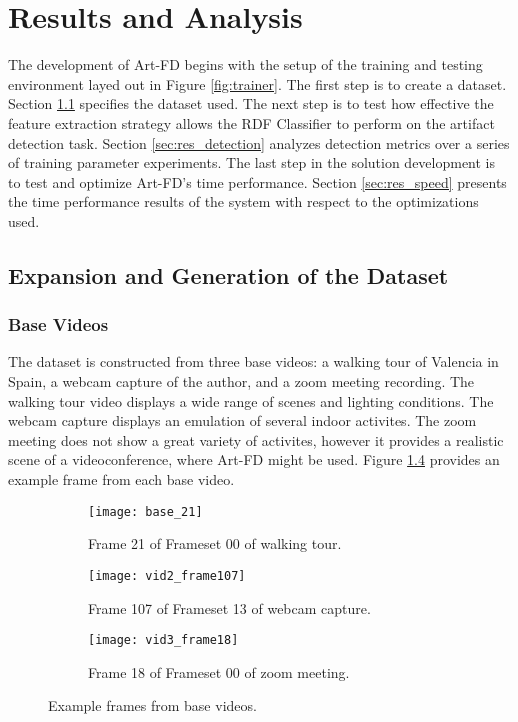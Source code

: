\chapter{Results and Analysis}
\label{chp:results}

The development of Art-FD begins with the setup of the training and testing environment layed out in Figure \ref{fig:trainer}. The first step is to create a dataset. Section \ref{sec:res_dataset} specifies the dataset used. The next step is to test how effective the feature extraction strategy allows the RDF Classifier to perform on the artifact detection task. Section \ref{sec:res_detection} analyzes detection metrics over a series of training parameter experiments. The last step in the solution development is to test and optimize Art-FD's time performance. Section \ref{sec:res_speed} presents the time performance results of the system with respect to the optimizations used.

\section{Expansion and Generation of the Dataset}
\label{sec:res_dataset}

\subsection{Base Videos}
\label{sec:res_base_videos}

The dataset is constructed from three base videos: a walking tour of Valencia in Spain, a webcam capture of the author, and a zoom meeting recording. The walking tour video displays a wide range of scenes and lighting conditions. The webcam capture displays an emulation of several indoor activites. The zoom meeting does not show a great variety of activites, however it provides a realistic scene of a videoconference, where Art-FD might be used. Figure \ref{fig:ds_example} provides an example frame from each base video.

\begin{figure} [!h]
  \centering
  
  \begin{subfigure}[t]{0.32\textwidth}
    \centering
    \texttt{[image: base\_21]}
    \caption{Frame 21 of Frameset 00 of walking tour. }
    \label{fig:ds_example.a}
  \end{subfigure}
  \hfill
  \begin{subfigure}[t]{0.32\textwidth}
    \centering
    \texttt{[image: vid2\_frame107]}
    \caption{Frame 107 of Frameset 13 of webcam capture. }
    \label{fig:ds_example.b}
  \end{subfigure}
  \hfill
  \begin{subfigure}[t]{0.32\textwidth}
    \centering
    \texttt{[image: vid3\_frame18]}
    \caption{Frame 18 of Frameset 00 of zoom meeting. }
    \label{fig:ds_example.c}
  \end{subfigure}

  \caption{Example frames from base videos. }
  \label{fig:ds_example}

\end{figure}

